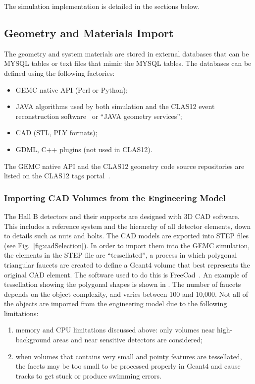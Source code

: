 The simulation implementation is detailed in the sections below.

\subsection{Geometry and Materials Import}

The geometry and system materials are stored in external databases that can be MYSQL tables or text files that
mimic the MYSQL tables. The databases can be defined using the following factories:

\begin{itemize}
	\item GEMC native API (Perl or Python);
	\item JAVA algorithms used by both simulation and the CLAS12 event reconstruction software~\cite{recon-nim}
          or ``JAVA geometry services'';
	\item CAD (STL, PLY formats);
	\item GDML, C++ plugins (not used in CLAS12).
\end{itemize}

The GEMC native API and the CLAS12 geometry code source repositories are listed on the CLAS12
tags portal~\cite{clas12Tags}.

\subsubsection{Importing CAD Volumes from the Engineering Model}

The Hall B detectors and their supports are designed with 3D CAD software. This includes a reference system and the
hierarchy of all detector elements, down to details such as nuts and bolts. The CAD models are exported into STEP
files~\cite{stepFiles} (see Fig.~\ref{fig:cadSelection}). In order to import them into the GEMC simulation, the elements
in the STEP file are ``tessellated'', a process in which polygonal triangular faucets are created to define a Geant4
volume that best represents the original CAD element. The software used to do this is FreeCad~\cite{freeCad}. An
example of tessellation showing the polygonal shapes is shown in . The number of faucets
depends on the object complexity, and varies between 100 and 10,000. Not all of the objects are imported from the
engineering model due to the following limitations:

\begin{enumerate}
\item memory and CPU limitations discussed above: only volumes near high-background areas and near sensitive detectors
  are considered;
\item when volumes that contains very small and pointy features are tessellated, the facets may be too small
      to be processed properly in Geant4 and cause tracks to get stuck or produce swimming errors.
\end{enumerate}

